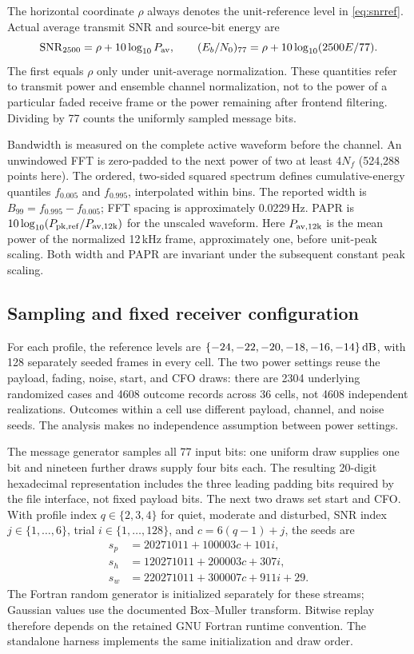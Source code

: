 The horizontal coordinate $\rho$ always denotes the unit-reference level
in \eqref{eq:snrref}. Actual average transmit SNR and source-bit energy are
\begin{equation}
 \mathrm{SNR}_{2500}=\rho+10\log_{10}P_{\rm av},\qquad
 (E_b/N_0)_{77}=\rho+10\log_{10}(2500E/77).
 \label{eq:physicalsnr}
\end{equation}
The first equals $\rho$ only under unit-average normalization. These quantities
refer to transmit power and ensemble channel normalization, not to the
power of a particular faded receive frame or the power remaining after
frontend filtering. Dividing by 77 counts the uniformly sampled message bits.

Bandwidth is measured on the complete active waveform before the channel.
An unwindowed FFT is zero-padded to the next power of two at least $4N_f$
(524,288 points here). The ordered, two-sided squared spectrum defines
cumulative-energy quantiles $f_{0.005}$ and $f_{0.995}$, interpolated within
bins. The reported width is $B_{99}=f_{0.995}-f_{0.005}$; FFT spacing is
approximately 0.0229\,Hz. PAPR is
$10\log_{10}(P_{\rm pk,ref}/P_{\rm av,12k})$ for the unscaled waveform.
Here $P_{\rm av,12k}$ is the mean power of the normalized 12\,kHz frame,
approximately one, before unit-peak scaling.
Both width and PAPR are invariant under the subsequent constant peak scaling.

\subsection{Sampling and fixed receiver configuration}

For each profile, the reference levels are
$\{-24,-22,-20,-18,-16,-14\}\,\mathrm{dB}$, with 128 separately seeded frames in every
cell. The two power settings reuse the payload, fading, noise, start, and
CFO draws: there are 2304 underlying randomized cases and 4608 outcome
records across 36 cells, not 4608 independent realizations. Outcomes within a cell use
different payload, channel, and noise seeds. The analysis makes no
independence assumption between power settings.

The message generator samples all 77 input bits: one uniform draw supplies
one bit and nineteen further draws supply four bits each. The resulting
20-digit hexadecimal representation includes the three leading padding
bits required by the file interface, not fixed payload bits. The next two
draws set start and CFO. With profile index
$q\in\{2,3,4\}$ for quiet, moderate and disturbed, SNR index
$j\in\{1,\ldots,6\}$, trial $i\in\{1,\ldots,128\}$, and
$c=6(q-1)+j$, the seeds are
\begin{align}
 s_p&=20271011+100003c+101i,\nonumber\\
 s_h&=120271011+200003c+307i,\nonumber\\
 s_w&=220271011+300007c+911i+29.
 \label{eq:seeds}
\end{align}
The Fortran random generator is initialized separately for these streams;
Gaussian values use the documented Box--Muller transform. Bitwise replay
therefore depends on the retained GNU Fortran runtime convention. The
standalone harness implements the same initialization and draw order.

